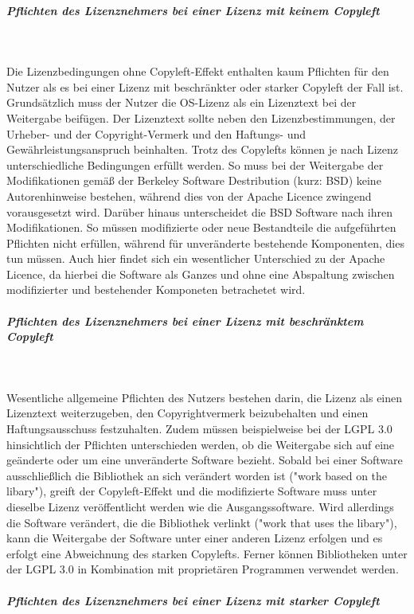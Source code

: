 \subparagraph{Pflichten des Lizenznehmers bei einer Lizenz mit keinem Copyleft}$~$

Die Lizenzbedingungen ohne Copyleft-Effekt enthalten kaum Pflichten für den Nutzer als es bei einer Lizenz mit beschränkter oder starker Copyleft der Fall ist. Grundsätzlich muss der Nutzer die OS-Lizenz als ein Lizenztext bei der Weitergabe beifügen. Der Lizenztext sollte neben den Lizenzbestimmungen, der Urheber- und der Copyright-Vermerk und den Haftungs- und Gewährleistungsanspruch beinhalten. Trotz des Copylefts können je nach Lizenz unterschiedliche Bedingungen erfüllt werden. So muss bei der Weitergabe der Modifikationen gemäß der Berkeley Software Destribution (kurz: BSD) keine Autorenhinweise bestehen, während dies von der Apache Licence zwingend vorausgesetzt wird. \cite[S. 60]{schaaf_open-source-lizenzen_2013} Darüber hinaus unterscheidet die BSD Software nach ihren Modifikationen. So müssen modifizierte oder neue Bestandteile die aufgeführten Pflichten nicht erfüllen, während für unveränderte bestehende Komponenten, dies tun müssen. Auch hier findet sich ein wesentlicher Unterschied zu der Apache Licence, da hierbei die Software als Ganzes und ohne eine Abspaltung zwischen modifizierter und bestehender Komponeten betrachetet wird. 

\subparagraph{Pflichten des Lizenznehmers bei einer Lizenz mit beschränktem Copyleft}$~$

Wesentliche allgemeine Pflichten des Nutzers bestehen darin, die Lizenz als einen Lizenztext weiterzugeben, den Copyrightvermerk beizubehalten und einen Haftungsausschuss festzuhalten. \cite[S. 11]{bitkom_open_nodate} Zudem müssen beispielweise bei der LGPL 3.0 hinsichtlich der Pflichten unterschieden werden, ob die Weitergabe sich auf eine geänderte oder um eine unveränderte Software bezieht. Sobald bei einer Software ausschließlich die Bibliothek an sich verändert worden ist ("work based on the libary"), greift der Copyleft-Effekt und die modifizierte Software muss unter dieselbe Lizenz veröffentlicht werden wie die Ausgangssoftware. \cite[S. 59]{schaaf_open-source-lizenzen_2013} Wird allerdings die Software verändert, die die Bibliothek verlinkt ("work that uses the libary"), kann die Weitergabe der Software unter einer anderen Lizenz erfolgen und es erfolgt eine Abweichnung des starken Copylefts. Ferner können Bibliotheken unter der LGPL 3.0 in Kombination mit proprietären Programmen verwendet werden.\cite[S. 65]{bitkom_open_2016}

\subparagraph{Pflichten des Lizenznehmers bei einer Lizenz mit starker Copyleft}$~$

